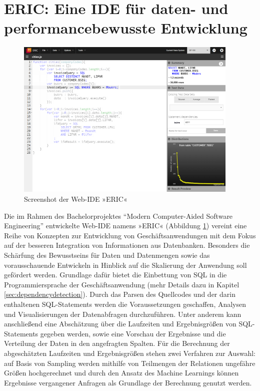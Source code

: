 \section{ERIC: Eine IDE f{\"u}r daten- und performancebewusste Entwicklung}\label{chap:entwicklungsumgebung}

%
%


\begin{figure}[ht]
	\centering
  \includegraphics[width=0.95\textwidth]{figures/ide.png}
	\caption{Screenshot der Web-IDE »ERIC«}
	\label{fig:ide}
\end{figure}

Die im Rahmen des Bachelorprojektes ``Modern Computer-Aided Software Engineering'' entwickelte Web-IDE namens »ERIC« (Abbildung \ref{fig:ide}) vereint eine Reihe von Konzepten zur Entwicklung von Geschäftsanwendungen mit dem Fokus auf der besseren Integration von Informationen aus Datenbanken.
Besonders die Schärfung des Bewusstseins für Daten und Datenmengen sowie das vorausschauende Entwickeln in Hinblick auf die Skalierung der Anwendung soll gefördert werden.
Grundlage dafür bietet die Einbettung von SQL in die Programmiersprache der Geschäftsanwendung \cite{Horschig2014} (mehr Details dazu in Kapitel \ref{sec:dependencydetection}).
Durch das Parsen des Quellcodes \cite{Horschig2014} und der darin enthaltenen SQL-Statements \cite{Schulz2014} werden die Voraussetzungen geschaffen, Analysen und Visualisierungen der Datenabfragen durchzuführen.
Unter anderem kann anschließend eine Abschätzung über die Laufzeiten und Ergebnisgrößen von SQL-Statements gegeben werden, sowie eine Vorschau der Ergebnisse und die Verteilung der Daten in den angefragten Spalten.
Für die Berechnung der abgeschätzten Laufzeiten und Ergebnisgrößen stehen zwei Verfahren zur Auswahl: auf Basis von Sampling \cite{Exner2014} werden mithilfe von Teilmengen der Relationen ungefähre Größen hochgerechnet und durch den Ansatz des Machine Learnings \cite{Mues2014} können Ergebnisse vergangener Anfragen als Grundlage der Berechnung genutzt werden.

